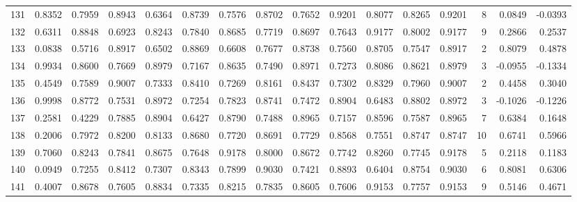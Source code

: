\begin{tabular}{lrrrrrrrrrrrrrrr}
131 &      0.8352 &  0.7959 &  0.8943 &  0.6364 &  0.8739 &  0.7576 &  0.8702 &  0.7652 &  0.9201 &  0.8077 &   0.8265 &     0.9201 &      8 &                    0.0849 &                    -0.0393 \\
132 &      0.6311 &  0.8848 &  0.6923 &  0.8243 &  0.7840 &  0.8685 &  0.7719 &  0.8697 &  0.7643 &  0.9177 &   0.8002 &     0.9177 &      9 &                    0.2866 &                     0.2537 \\
133 &      0.0838 &  0.5716 &  0.8917 &  0.6502 &  0.8869 &  0.6608 &  0.7677 &  0.8738 &  0.7560 &  0.8705 &   0.7547 &     0.8917 &      2 &                    0.8079 &                     0.4878 \\
134 &      0.9934 &  0.8600 &  0.7669 &  0.8979 &  0.7167 &  0.8635 &  0.7490 &  0.8971 &  0.7273 &  0.8086 &   0.8621 &     0.8979 &      3 &                   -0.0955 &                    -0.1334 \\
135 &      0.4549 &  0.7589 &  0.9007 &  0.7333 &  0.8410 &  0.7269 &  0.8161 &  0.8437 &  0.7302 &  0.8329 &   0.7960 &     0.9007 &      2 &                    0.4458 &                     0.3040 \\
136 &      0.9998 &  0.8772 &  0.7531 &  0.8972 &  0.7254 &  0.7823 &  0.8741 &  0.7472 &  0.8904 &  0.6483 &   0.8802 &     0.8972 &      3 &                   -0.1026 &                    -0.1226 \\
137 &      0.2581 &  0.4229 &  0.7885 &  0.8904 &  0.6427 &  0.8790 &  0.7488 &  0.8965 &  0.7157 &  0.8596 &   0.7587 &     0.8965 &      7 &                    0.6384 &                     0.1648 \\
138 &      0.2006 &  0.7972 &  0.8200 &  0.8133 &  0.8680 &  0.7720 &  0.8691 &  0.7729 &  0.8568 &  0.7551 &   0.8747 &     0.8747 &     10 &                    0.6741 &                     0.5966 \\
139 &      0.7060 &  0.8243 &  0.7841 &  0.8675 &  0.7648 &  0.9178 &  0.8000 &  0.8672 &  0.7742 &  0.8260 &   0.7745 &     0.9178 &      5 &                    0.2118 &                     0.1183 \\
140 &      0.0949 &  0.7255 &  0.8412 &  0.7307 &  0.8343 &  0.7899 &  0.9030 &  0.7421 &  0.8893 &  0.6404 &   0.8754 &     0.9030 &      6 &                    0.8081 &                     0.6306 \\
141 &      0.4007 &  0.8678 &  0.7605 &  0.8834 &  0.7335 &  0.8215 &  0.7835 &  0.8605 &  0.7606 &  0.9153 &   0.7757 &     0.9153 &      9 &                    0.5146 &                     0.4671 \\

\end{tabular}
